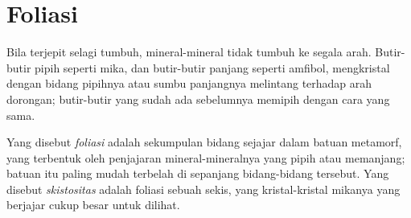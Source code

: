 \section{Foliasi}\label{sec:g12:metamorphic-rocks:foliation}

Bila terjepit selagi tumbuh, mineral-mineral tidak tumbuh ke segala arah.
Butir-butir pipih seperti mika, dan butir-butir panjang seperti amfibol,
mengkristal dengan bidang pipihnya atau sumbu panjangnya melintang terhadap
arah dorongan; butir-butir yang sudah ada sebelumnya memipih dengan cara yang
sama.

\begin{definition}\label{def:g12:metamorphic-rocks:foliation}
Yang disebut \emph{foliasi} adalah sekumpulan bidang sejajar
dalam batuan metamorf, yang terbentuk oleh penjajaran mineral-mineralnya yang
pipih atau memanjang; batuan itu paling mudah terbelah di sepanjang
bidang-bidang tersebut. Yang disebut \emph{skistositas}
adalah foliasi sebuah sekis, yang kristal-kristal mikanya yang berjajar cukup
besar untuk dilihat.
\end{definition}

